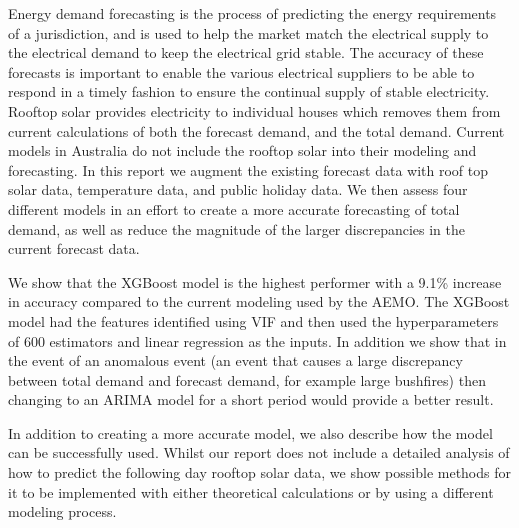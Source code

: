 \documentclass[mstat,12pt]{unswthesis}
\begin{document}


Energy demand forecasting is the process of predicting the energy
requirements of a jurisdiction, and is used to help the market match the
electrical supply to the electrical demand to keep the electrical grid
stable. The accuracy of these forecasts is important to enable the
various electrical suppliers to be able to respond in a timely fashion
to ensure the continual supply of stable electricity. Rooftop solar
provides electricity to individual houses which removes them from
current calculations of both the forecast demand, and the total demand.
Current models in Australia do not include the rooftop solar into their
modeling and forecasting. In this report we augment the existing
forecast data with roof top solar data, temperature data, and public
holiday data. We then assess four different models in an effort to
create a more accurate forecasting of total demand, as well as reduce
the magnitude of the larger discrepancies in the current forecast data.

\par

We show that the XGBoost model is the highest performer with a 9.1\%
increase in accuracy compared to the current modeling used by the AEMO.
The XGBoost model had the features identified using VIF and then used
the hyperparameters of 600 estimators and linear regression as the
inputs. In addition we show that in the event of an anomalous event (an
event that causes a large discrepancy between total demand and forecast
demand, for example large bushfires) then changing to an ARIMA model for
a short period would provide a better result.

\par

In addition to creating a more accurate model, we also describe how the
model can be successfully used. Whilst our report does not include a
detailed analysis of how to predict the following day rooftop solar
data, we show possible methods for it to be implemented with either
theoretical calculations or by using a different modeling process.



\afterpreface





%
%
\end{document}
